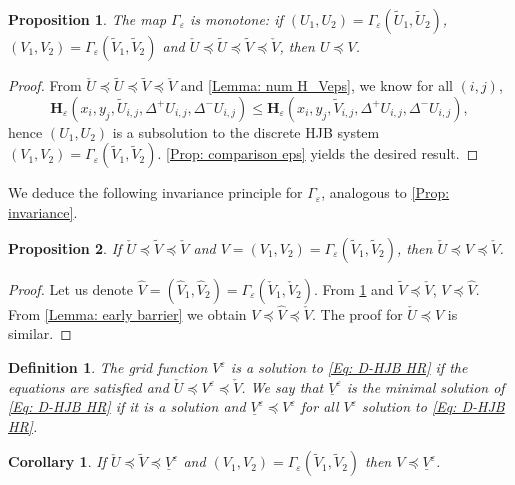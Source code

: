 \documentclass[11pt]{article}
\numberwithin{equation}{section}
\numberwithin{algorithm}{section}
\newtheorem{proposition}[proposition]{Proposition}
\newtheorem{corollary}[corollary]{Corollary}
\newtheorem{definition}[definition]{Definition}
\newcommand{\lc}{\left(}
\newcommand{\rc}{\right)}
\newcommand{\eps}{\varepsilon}
\theoremstyle{plain}
\newcommand{\D}{\Delta}
\begin{document}
\begin{proposition}\label{Lemma: monotone fp}
The map $\Gamma_{\eps}$ is monotone: if $(U_1,U_2)=\Gamma_{\eps}(\widetilde{U}_1,\widetilde{U}_2)$, $(V_1,V_2)=\Gamma_{\eps}(\widetilde{V}_1,\widetilde{V}_2)$ and $\check{U}\preceq \widetilde{U}\preceq \widetilde{V}\preceq \check{V}$, then ${U}\preceq {V}$.
\end{proposition}
\begin{proof}
From $\check{U}\preceq \widetilde{U}\preceq \widetilde{V}\preceq \check{V}$ and \cref{Lemma: num H_Veps}, we know for all $(i,j)$,
$$
\boldsymbol{H}_{\eps}\lc x_{i},y_{j},\widetilde{U}_{i,j},\D^+{{U}_{i,j}},\D^-{{U}_{i,j}}\rc
\leq \boldsymbol{H}_{\eps}\lc x_{i},y_{j},\widetilde{V}_{i,j},\D^+{{U}_{i,j}},\D^-{{U}_{i,j}}\rc,
$$
hence $(U_1,U_2)$ is a subsolution to the discrete HJB system $(V_1,V_2)=\Gamma_{\eps}(\widetilde{V}_1,\widetilde{V}_2)$. \cref{Prop: comparison eps} yields the desired result. 
\end{proof}
We deduce the following invariance principle for $\Gamma_{\eps}$, analogous to \cref{Prop: invariance}. 
\begin{proposition}\label{Prop: invariance eps}
If $\check{U}\preceq \widetilde{V}\preceq \check{V}$ and $V=(V_1,V_2)=\Gamma_{\eps}(\widetilde{V}_1,\widetilde{V}_2)$, then $\check{U}\preceq {V}\preceq \check{V}$. 
\end{proposition}
\begin{proof}
Let us denote $\widehat{V}=(\widehat{V}_1,\widehat{V}_2)=\Gamma_{\eps}(\check{V}_1,\check{V}_2)$. From \cref{Lemma: monotone fp} and $\widetilde{V}\preceq \check{V}$, $V \preceq \widehat{V}$. From \cref{Lemma: early barrier} we obtain $V\preceq \widehat{V}\preceq \check{V}$. The proof for $\check{U}\preceq {V}$ is similar.
\end{proof}
\begin{definition}\label{Def: sol early}
The grid function $V^{\eps}$ is a solution to \cref{Eq: D-HJB HR} if the equations are satisfied and $\check{U}\preceq V^{\eps}\preceq \check{V}$. We say that $\underline{V}^{\eps}$ is the minimal solution of \cref{Eq: D-HJB HR} if it is a solution and $\underline{V}^{\eps}\preceq V^{\eps}$ for all $V^{\eps}$ solution to \cref{Eq: D-HJB HR}.
\end{definition}
\begin{corollary}\label{Cor: leq Vmin}
If $\check{U}\preceq \widetilde{V}\preceq \underline{V}^{\eps}$ and $(V_1,V_2)=\Gamma_{\eps}(\widetilde{V}_1,\widetilde{V}_2)$ then ${V}\preceq \underline{V}^{\eps}$.
\end{corollary}
\end{document}
